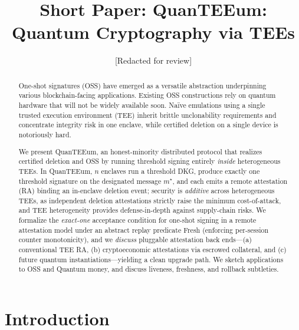 \documentclass[runningheads,orivec]{llncs}
\newcommand{\prot}{\textsf{QuanTEEum}}
\begin{document}
\title{Short Paper: QuanTEEum: Quantum Cryptography via TEEs}
\author{[Redacted for review]}
\maketitle

\begin{abstract}
One-shot signatures (OSS) have emerged as a versatile abstraction underpinning various blockchain-facing applications. Existing OSS constructions rely on quantum hardware that will not be widely available soon. Naïve emulations using a single trusted execution environment (TEE) inherit brittle unclonability requirements and concentrate integrity risk in one enclave, while certified deletion on a single device is notoriously hard. 

We present \prot{}, an honest-minority distributed protocol that realizes certified deletion and OSS by running threshold signing entirely \emph{inside} heterogeneous TEEs. In \prot{}, $n$ enclaves run a threshold DKG, produce exactly one threshold signature on the designated message $m^{\star}$, and each emits a remote attestation (RA) binding an in-enclave deletion event; security is \emph{additive} across heterogeneous TEEs, as independent deletion attestations strictly raise the minimum cost\mbox{-}of\mbox{-}attack, and TEE heterogeneity provides defense-in-depth against supply-chain risks. We formalize the \emph{exact-one} acceptance condition for one-shot signing in a remote attestation model under an abstract replay predicate \textsf{Fresh} (enforcing per-session counter monotonicity), and we \emph{discuss} pluggable attestation back ends—(a) conventional TEE RA, (b) cryptoeconomic attestations via escrowed collateral, and (c) future quantum instantiations—yielding a clean upgrade path. We sketch applications to OSS and Quantum money, and discuss liveness, freshness, and rollback subtleties. 
\end{abstract}

\section{Introduction}
\end{document}
